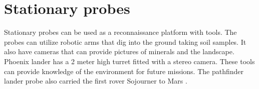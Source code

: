 \section{Stationary probes}
 Stationary probes can be used as a reconnaissance platform with tools. The probes can utilize robotic arms that dig into the ground taking soil samples. It also have cameras that can provide pictures of minerals and the landscape. Phoenix lander has a 2 meter high turret fitted with a stereo camera. These tools can provide knowledge of the environment for future missions.
The pathfinder lander probe also carried the first rover Sojourner to Mars\cite{Sojounerroverjpl} \cite{landerpho} \cite{landerpho1}.





